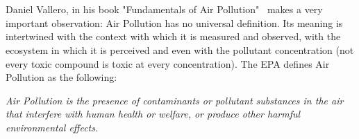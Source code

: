 
\section{}%
\label{sec:ap}

Daniel Vallero, in his book "Fundamentals of Air
Pollution"~\cite{Vallero2014} makes a very important observation: Air
Pollution has no universal definition. Its meaning is intertwined with
the context with which it is measured and observed, with the ecosystem
in which it is perceived and even with the pollutant concentration (not
every toxic compound is toxic at every concentration). The \gls{EPA}
defines Air Pollution as the following:

\begin{center}
    \begin{minipage}{0.8\textwidth}

        \noindent \textit{Air Pollution is the presence of contaminants
        or pollutant substances in the air that interfere with human
        health or welfare, or produce other harmful environmental effects.}

    \end{minipage}
\end{center}

